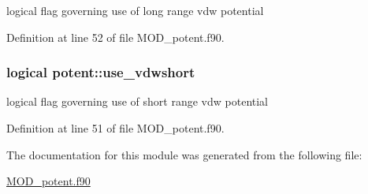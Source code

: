 logical flag governing use of long range vdw potential 



Definition at line 52 of file M\-O\-D\-\_\-potent.\-f90.

\hypertarget{classpotent_a767fd97701d5ddfcce6bf907c43832d7}{
\subsubsection[{use\-\_\-vdwshort}]{\setlength{\rightskip}{0pt plus 5cm}logical potent\-::use\-\_\-vdwshort}}\label{classpotent_a767fd97701d5ddfcce6bf907c43832d7}


logical flag governing use of short range vdw potential 



Definition at line 51 of file M\-O\-D\-\_\-potent.\-f90.



The documentation for this module was generated from the following file\-:\begin{DoxyCompactItemize}
\item 
\hyperlink{MOD__potent_8f90}{M\-O\-D\-\_\-potent.\-f90}\end{DoxyCompactItemize}

